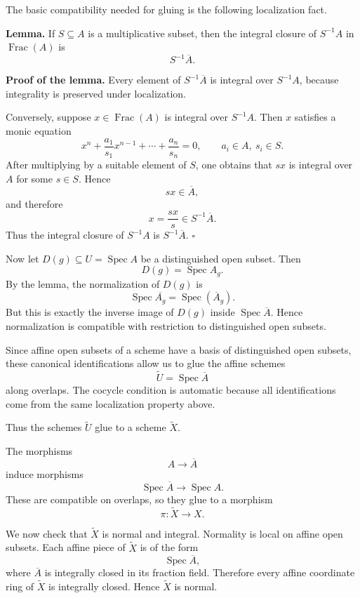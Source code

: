 \documentclass[12pt,a4paper]{article}
\theoremstyle{notespace}
\begin{document}
The basic compatibility needed for gluing is the following localization
fact.

\medskip

\textbf{Lemma.}
If \(S\subseteq A\) is a multiplicative subset, then the integral closure
of \(S^{-1}A\) in \(\operatorname{Frac}(A)\) is
\[
S^{-1}\overline{A}.
\]

\textbf{Proof of the lemma.}
Every element of \(S^{-1}\overline{A}\) is integral over \(S^{-1}A\),
because integrality is preserved under localization.

Conversely, suppose \(x\in \operatorname{Frac}(A)\) is integral over
\(S^{-1}A\). Then \(x\) satisfies a monic equation
\[
x^n+\frac{a_1}{s_1}x^{n-1}+\cdots+\frac{a_n}{s_n}=0,
\qquad a_i\in A,\ s_i\in S.
\]
After multiplying by a suitable element of \(S\), one obtains that
\(sx\) is integral over \(A\) for some \(s\in S\). Hence
\[
sx\in \overline{A},
\]
and therefore
\[
x=\frac{sx}{s}\in S^{-1}\overline{A}.
\]
Thus the integral closure of \(S^{-1}A\) is \(S^{-1}\overline{A}\).
\(\square\)

\medskip

Now let \(D(g)\subseteq U=\operatorname{Spec}A\) be a distinguished open
subset. Then
\[
D(g)=\operatorname{Spec}A_g.
\]
By the lemma, the normalization of \(D(g)\) is
\[
\operatorname{Spec}\overline{A_g}
=
\operatorname{Spec}(\overline{A}_g).
\]
But this is exactly the inverse image of \(D(g)\) inside
\(\operatorname{Spec}\overline{A}\). Hence normalization is compatible
with restriction to distinguished open subsets.

Since affine open subsets of a scheme have a basis of distinguished
open subsets, these canonical identifications allow us to glue the affine
schemes
\[
\widetilde{U}=\operatorname{Spec}\overline{A}
\]
along overlaps. The cocycle condition is automatic because all
identifications come from the same localization property above.

Thus the schemes \(\widetilde{U}\) glue to a scheme \(\widetilde{X}\).

The morphisms
\[
A\longrightarrow \overline{A}
\]
induce morphisms
\[
\operatorname{Spec}\overline{A}\longrightarrow \operatorname{Spec}A.
\]
These are compatible on overlaps, so they glue to a morphism
\[
\pi:\widetilde{X}\longrightarrow X.
\]

We now check that \(\widetilde{X}\) is normal and integral. Normality is
local on affine open subsets. Each affine piece of \(\widetilde{X}\) is
of the form
\[
\operatorname{Spec}\overline{A},
\]
where \(\overline{A}\) is integrally closed in its fraction field.
Therefore every affine coordinate ring of \(\widetilde{X}\) is integrally
closed. Hence \(\widetilde{X}\) is normal.
\end{document}
